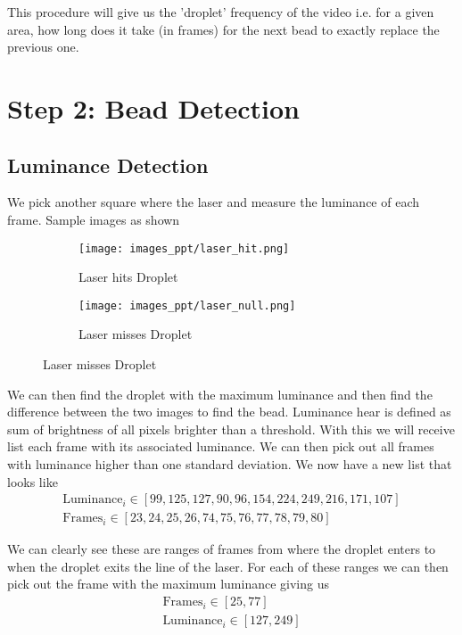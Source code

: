 \documentclass[hidelinks]{book}
\numberwithin{equation}{section}
\begin{document}
This procedure will give us the 'droplet' frequency of the video i.e. for a given area, how long does it take (in frames) for the next bead to exactly replace the previous one.

\section{Step 2: Bead Detection}\label{sec:step2}
\subsection{Luminance Detection}\label{ssec:lum}
We pick another square where the laser and measure the luminance of each frame. Sample images as shown

\begin{figure}[H]
  \centering
  \begin{subfigure}{.5\textwidth}
    \centering
    \texttt{[image: images\_ppt/laser\_hit.png]}
    \caption{Laser hits Droplet}
  \end{subfigure}%
  \begin{subfigure}{.5\textwidth}
    \centering
    \texttt{[image: images\_ppt/laser\_null.png]}
    \caption{Laser misses Droplet}
  \end{subfigure}
\end{figure}

We can then find the droplet with the maximum luminance and then find the difference between the two images to find the bead. Luminance hear is defined as sum of brightness of all pixels brighter than a threshold. With this we will receive list each frame with its associated luminance. We can then pick out all frames with luminance higher than one standard deviation. We now have a new list that looks like
%
\begin{align*}
  \text{Luminance}_i \in [99, 125, 127, 90, 96, 154, 224, 249, 216, 171, 107] \\
  \text{Frames}_i \in [23, 24, 25, 26, 74, 75, 76, 77, 78, 79, 80]
\end{align*}

We can clearly see these are ranges of frames from where the droplet enters to when the droplet exits the line of the laser. For each of these ranges we can then pick out the frame with the maximum luminance giving us
%
\begin{align*}
  \text{Frames}_i \in [25, 77] \\
  \text{Luminance}_i \in [127, 249]
\end{align*}
\end{document}

